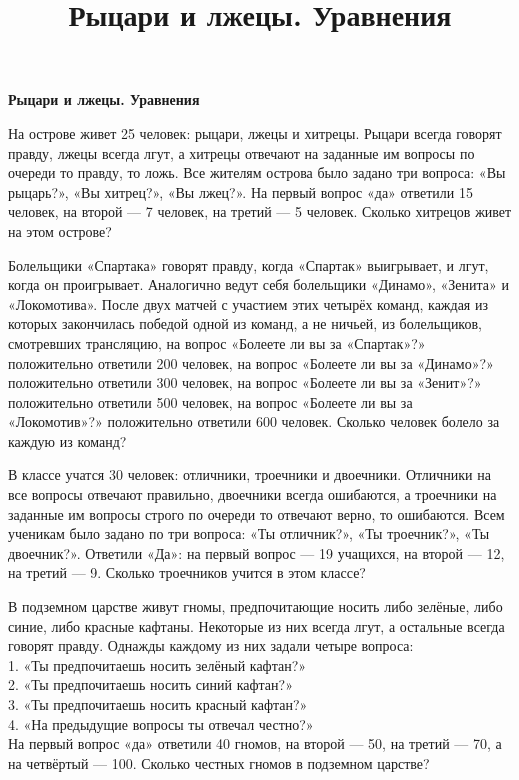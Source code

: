 \centerline{\bf \Huge Рыцари и лжецы. Уравнения}
\title{ Рыцари и лжецы. Уравнения}

 На острове живет 25 человек: рыцари, лжецы и хитрецы. Рыцари всегда говорят правду, лжецы всегда лгут, а хитрецы отвечают на заданные им вопросы по очереди то правду, то ложь. Все жителям острова было задано три вопроса: «Вы рыцарь?», «Вы хитрец?», «Вы лжец?». На первый вопрос «да» ответили 15 человек, на второй — 7 человек, на третий — 5 человек. Сколько хитрецов живет на этом острове?

 Болельщики «Спартака» говорят правду, когда «Спартак»
выигрывает, и лгут, когда он проигрывает. Аналогично ведут себя болельщики «Динамо», «Зенита» и «Локомотива». После двух матчей с участием этих четырёх команд, каждая из которых закончилась победой одной из команд, а не ничьей, из болельщиков, смотревших трансляцию, на вопрос «Болеете ли вы за «Спартак»?» положительно ответили 200 человек, на вопрос «Болеете ли вы за «Динамо»?» положительно ответили 300 человек, на вопрос «Болеете ли вы за «Зенит»?» положительно ответили 500 человек, на вопрос «Болеете ли вы за «Локомотив»?» положительно ответили 600 человек. Сколько человек болело за каждую из команд?

 В классе учатся 30 человек: отличники, троечники и двоечники. Отличники на все вопросы отвечают правильно, двоечники всегда ошибаются, а троечники на заданные им вопросы строго по очереди то отвечают верно, то ошибаются. Всем ученикам было задано по три вопроса: «Ты отличник?», «Ты троечник?», «Ты двоечник?». Ответили «Да»: на первый вопрос — 19 учащихся, на второй — 12, на третий — 9. Сколько троечников учится в этом классе?

 В подземном царстве живут гномы, предпочитающие носить либо
зелёные, либо синие, либо красные кафтаны. Некоторые из них всегда лгут, а остальные всегда говорят правду. Однажды каждому из них задали четыре вопроса:\\
1. «Ты предпочитаешь носить зелёный кафтан?»\\
2. «Ты предпочитаешь носить синий кафтан?»\\
3. «Ты предпочитаешь носить красный кафтан?»\\
4. «На предыдущие вопросы ты отвечал честно?» \\
На первый вопрос «да» ответили 40 гномов, на второй — 50, на третий — 70, а на четвёртый — 100. Сколько честных гномов в подземном царстве?



